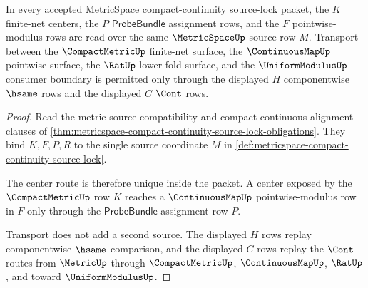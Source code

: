 \begin{theorem}
\label{thm:metricspace-source-lock-center-alignment}
In every accepted MetricSpace compact-continuity source-lock packet, the $K$ finite-net centers, the $P$ $\mathsf{ProbeBundle}$ assignment rows, and the $F$ pointwise-modulus rows are read over the same $\MetricSpaceUp$ source row $M$. Transport between the $\CompactMetricUp$ finite-net surface, the $\ContinuousMapUp$ pointwise surface, the $\RatUp$ lower-fold surface, and the $\UniformModulusUp$ consumer boundary is permitted only through the displayed $H$ componentwise $\hsame$ rows and the displayed $C$ $\Cont$ rows.
\end{theorem}
\begin{proof}
Read the metric source compatibility and compact-continuous alignment clauses of \autoref{thm:metricspace-compact-continuity-source-lock-obligations}. They bind $K,F,P,R$ to the single source coordinate $M$ in \autoref{def:metricspace-compact-continuity-source-lock}.

The center route is therefore unique inside the packet. A center exposed by the $\CompactMetricUp$ row $K$ reaches a $\ContinuousMapUp$ pointwise-modulus row in $F$ only through the $\mathsf{ProbeBundle}$ assignment row $P$.

Transport does not add a second source. The displayed $H$ rows replay componentwise $\hsame$ comparison, and the displayed $C$ rows replay the $\Cont$ routes from $\MetricUp$ through $\CompactMetricUp$, $\ContinuousMapUp$, $\RatUp$, and toward $\UniformModulusUp$.
\end{proof}


